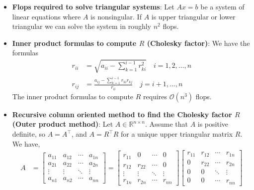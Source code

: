 \documentclass{report}
\begin{document}
\begin{itemize}
        \item \textbf{Flops required to solve triangular systems}: Let $Ax = b$ be a system of linear equations where $A$ is nonsingular. If $A$ is upper triangular or lower triangular we can solve the system in roughly $n^{2}$ flops.
        \item \textbf{Inner product formulas to compute $R$ (Cholesky factor)}: We have the formulas
            \begin{align*}
                r_{ii} &= \sqrt{a_{ii} - \sum_{k=1}^{i-1}r_{ki}^{2}} \quad i = 1,2,...,n \\
                r_{ij} &= \frac{a_{ij} - \sum_{k=1}^{i-1}r_{ki}r_{kj}}{r_{ii}} \quad j = i+1,...,n
            \end{align*}
            \bigbreak \noindent 
            The inner product formulas to compute $R$ requires $\mathcal{O}(n^{3})$ flops.
        \item \textbf{Recursive column oriented method to find the Cholesky factor $R$ (Outer product method)}: Let $A \in \mathbb{R}^{n\times n}$. Assume that $A$ is positive definite, so $A = A^{\top}$, and $A = R^{\top}R$ for a unique upper triangular matrix $R$. We have,
            \begin{align*}
                A &= \begin{bmatrix} a_{11} & a_{12} & \cdots & a_{1n} \\ a_{21} & a_{22} & \cdots & a_{2n} \\ \vdots & \vdots & \ddots & \vdots \\ a_{n1} & a_{n2} & \cdots & a_{nn} \end{bmatrix} = 
                \begin{bmatrix}
                    r_{11} & 0  & \cdots & 0\\
                    r_{12} & r_{22}  &  \cdots & 0 \\
                    \vdots & \vdots & \ddots & \vdots\\
                    r_{1n} & r_{2n} & \cdots & r_{nn}
                \end{bmatrix}
                \begin{bmatrix}
                    r_{11} & r_{12} & \cdots & r_{1n} \\
                    0 & r_{22} & \cdots & r_{2n} \\
                    0 & 0 & \ddots & \vdots \\
                    0 & 0  & \cdots & r_{nn}
                \end{bmatrix}

\end{align*}
\end{itemize}
\end{document}
